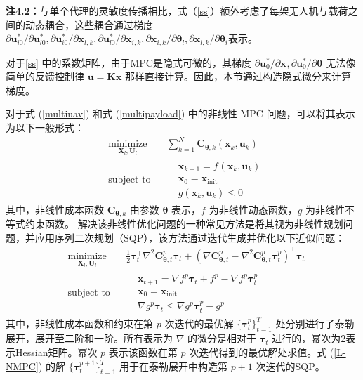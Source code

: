 \documentclass[lang=chs, degree=master, blindreview=false, winfonts=true]{yanputhesis}
\begin{document}
\textbf{注4.2：}与单个代理的灵敏度传播相比，式（\ref{ss}）额外考虑了每架无人机与载荷之间的动态耦合，这些耦合通过梯度 \( {\partial \bm{u}_{i0}^*}/{\partial \bm{u}_{l0}^*}, {\partial \bm{u}_{i0}^*}/{\partial \bm{x}_{l,k}}, {\partial \bm{u}_{l0}^*}/{\partial \bm{x}_{i,k}}, {\partial \bm{x}_{i,k}}/{\partial \bm{\theta}_l}, {\partial \bm{x}_{l,k}}/{\partial \bm{\theta}_i} \)表示。

对于\autoref{ss} 中的系数矩阵，由于MPC是隐式可微的，其梯度 \( {\partial \bm u_{0}^*}/{\partial \bm x_{}}, {\partial \bm u_{0}^*}/{\partial \bm \theta_{}} \) 无法像简单的反馈控制律 \( \bm u = \bm K \bm x \) 那样直接计算。因此，本节通过构造隐式微分来计算梯度。

对于式 (\ref{multiuav}) 和式 (\ref{multipayload}) 中的非线性 MPC 问题，可以将其表示为以下一般形式：
\begin{equation}
\begin{aligned} 
&\operatorname*{minimize}_{\bm{X}_l, \bm{U}_l} & &  \sum_{k=1}^N{\bm C}_{\bm \theta,k}(\bm x_k,\bm u_k) \\
&\text{subject to} & & \begin{aligned}
& \bm{x}_{k+1} ={f}_{}(\bm{x}_{k}, \bm{u}_{k}) \\
& \bm{x}_{0} = \bm{x}_\text{init}\\
& g(\bm x_k,\bm u_k) \leqslant 0	
\end{aligned}	
\end{aligned}
\label{NMPC}
\end{equation}
其中，非线性成本函数 \( \bm C_{\bm \theta,k} \) 由参数 \( \bm \theta \) 表示，\( f \) 为非线性动态函数，\( g \) 为非线性不等式约束函数。
解决该非线性优化问题的一种常见方法是将其视为非线性规划问题，并应用序列二次规划（SQP），该方法通过迭代生成并优化以下近似问题：
\begin{equation}
\begin{aligned} 
&\operatorname*{minimize}_{\bm{X}_l, \bm{U}_l} & & \frac{1}{2}\bm{\tau}_{t}^{\top}\nabla^{2}\bm C_{\bm \theta,t}^{p}\bm{\tau}_{t}+(\nabla \bm C_{\bm \theta,t}^{p}-\nabla^{2}\bm C_{\bm \theta,t}^{p}\bm{\tau}_{t}^{p})^{\top}\bm{\tau}_{t} \\
&\text{subject to} & & \begin{aligned}
& \bm{x}_{t+1}=\nabla f^{p}\bm{\tau}_{t}+f^{p}-\nabla f^{p}\bm{\tau}_{t}^{p} \\
& \bm{x}_{0} = \bm{x}_\text{init} \\
& \nabla g^{p}\bm{\tau}_{t}\leq\nabla g^{p}\bm{\tau}_{t}^{p}-g^{p}	
\end{aligned}
\end{aligned}	
\label{L-NMPC}
\end{equation}
其中，非线性成本函数和约束在第 \(p\) 次迭代的最优解 \( \{\bm  \tau_t^p \}_{t=1}^{T} \) 处分别进行了泰勒展开，展开至二阶和一阶。所有表示为 \( \nabla \) 的微分是相对于 \( \bm \tau_t \) 进行的，幂次为2表示Hessian矩阵。幂次 \( p \) 表示该函数在第 \( p \) 次迭代得到的最优解处求值。式 (\ref{L-NMPC}) 的解 \( \{\bm \tau_t^{p+1} \}_{t=1}^{T} \) 用于在泰勒展开中构造第 \( p+1 \) 次迭代的SQP。
\end{document}
